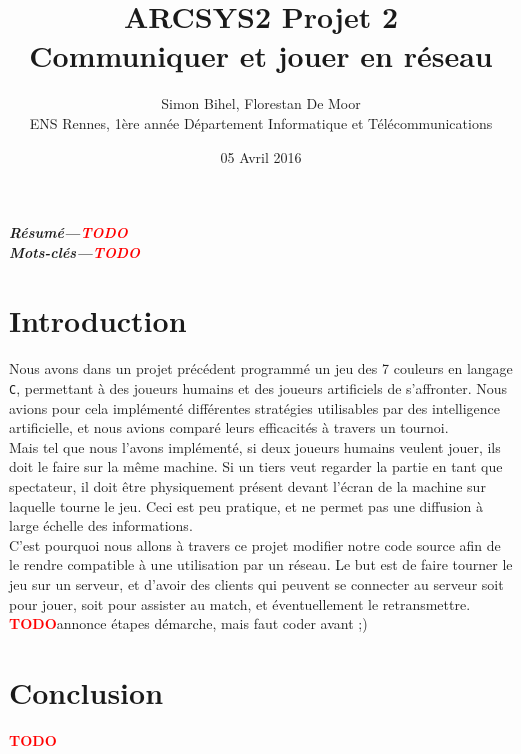 \documentclass[a4paper]{article}
\providecommand{\resume}[1]{\textbf{\textit{Résumé---#1}}}
\providecommand{\keywords}[1]{\textbf{\textit{Mots-clés---#1}}}
\newcommand{\TODO}{\textcolor{red}{\textbf{TODO}}}
\begin{document}
\title{ARCSYS2 Projet 2%
	\\ Communiquer et jouer en réseau}
\author{Simon Bihel, Florestan De Moor%
	 \\ ENS Rennes, 1ère année Département Informatique et Télécommunications}
\date{05 Avril 2016}

\maketitle

\resume{\TODO}\\

\keywords{\TODO}

\section*{Introduction}


Nous avons dans un projet précédent programmé un jeu des 7 couleurs en langage \texttt{C}, permettant à des joueurs humains et des joueurs artificiels de s'affronter. Nous avions pour cela implémenté différentes stratégies utilisables par des intelligence artificielle, et nous avions comparé leurs efficacités à travers un tournoi. \\

Mais tel que nous l'avons implémenté, si deux joueurs humains veulent jouer, ils doit le faire sur la même machine. Si un tiers veut regarder la partie en tant que spectateur, il doit être physiquement présent devant l'écran de la machine sur laquelle tourne le jeu. Ceci est peu pratique, et ne permet pas une diffusion à large échelle des informations. \\

C'est pourquoi nous allons à travers ce projet modifier notre code source afin de le rendre compatible à une utilisation par un réseau. Le but est de faire tourner le jeu sur un serveur, et d'avoir des clients qui peuvent se connecter au serveur soit pour jouer, soit pour assister au match, et éventuellement le retransmettre. \\

\TODO annonce étapes démarche, mais faut coder avant ;)



\section*{Conclusion}

\TODO


 

\end{document}
